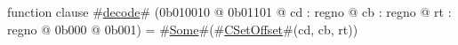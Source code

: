 function clause #\hyperref[zdecode]{decode}# (0b010010 @ 0b01101 @ cd : regno @ cb : regno @ rt : regno @ 0b000 @ 0b001) = #\hyperref[zSome]{Some}#(#\hyperref[zCSetOffset]{CSetOffset}#(cd, cb, rt))
